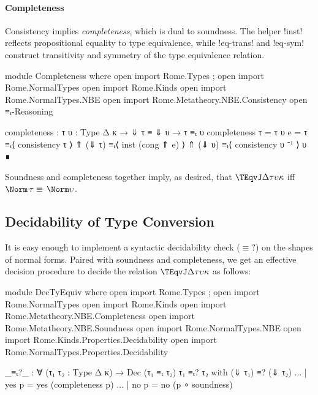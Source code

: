 \paragraph{Completeness}

Consistency implies \emph{completeness}, which is dual to soundness. The helper !inst! reflects propositional equality to type equivalence, while !eq-trans! and !eq-sym! construct transitivity and symmetry of the type equivalence relation.

\begin{AgdaAlign}
\begin{code}[hide] 
module Completeness where
  open import Rome.Types ; open import Rome.NormalTypes
  open import Rome.Kinds
  open import Rome.NormalTypes.NBE
  open import Rome.Metatheory.NBE.Consistency
  open ≡ₜ-Reasoning
\end{code}
\begin{code}
  completeness : {τ υ : Type Δ κ} →
                 ⇓ τ ≡ ⇓ υ → τ ≡ₜ υ 
  completeness {τ = τ} {υ} e = 
   τ        ≡ₜ⟨ consistency τ ⟩ 
   ⇑ (⇓ τ)  ≡ₜ⟨ inst (cong ⇑ e) ⟩ 
   ⇑ (⇓ υ)  ≡ₜ⟨ consistency υ ⁻¹ ⟩ 
   υ ∎ 
\end{code}
\end{AgdaAlign}

\Ni Soundness and completeness together imply, as desired, that $\TEqvJ \Delta \tau \upsilon \kappa$ iff $\Norm\, \tau \equiv\, \Norm \upsilon$.

\subsection{Decidability of Type Conversion}

It is easy enough to implement a syntactic decidability check ($\equiv?$) on the shapes of normal forms. Paired with soundness and completeness, we get an effective decision procedure to decide the relation $\TEqvJ \Delta \tau \upsilon \kappa$ as follows:

\begin{AgdaAlign}
\begin{code}[hide]
module DecTyEquiv where
  open import Rome.Types ; open import Rome.NormalTypes
  open import Rome.Kinds
  open import Rome.Metatheory.NBE.Completeness
  open import Rome.Metatheory.NBE.Soundness
  open import Rome.NormalTypes.NBE 
  open import Rome.Kinds.Properties.Decidability
  open import Rome.NormalTypes.Properties.Decidability
\end{code}
\begin{code}
  _≡ₜ?_ : ∀ (τ₁ τ₂ : Type Δ κ) → Dec (τ₁ ≡ₜ τ₂)
  τ₁ ≡ₜ? τ₂  with (⇓ τ₁) ≡? (⇓ τ₂)
  ... | yes p = yes (completeness p)
  ... | no  p = no (p ∘ soundness)
\end{code}
\end{AgdaAlign}

